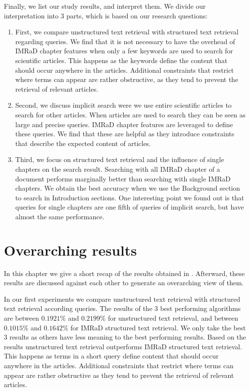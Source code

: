 Finally, we list our study results, and interpret them. We divide our interpretation into $3$ parts, which is based on our research questions:
\begin{enumerate}[label=(\alph*)]
  \item First, we compare unstructured text retrieval with structured text retrieval regarding queries. We find that it is not necessary to have the overhead of IMRaD chapter features when only a few keywords are used to search for scientific articles. This happens as the keywords define the content that should occur anywhere in the articles. Additional constraints that restrict where terms can appear are rather obstructive, as they tend to prevent the retrieval of relevant articles.
  \item Second, we discuss implicit search were we use entire scientific articles to search for other articles. When articles are used to search they can be seen as large and precise queries. IMRaD chapter features are leveraged to define these queries. We find that these are helpful as they introduce constraints that describe the expected content of articles.
  \item Third, we focus on structured text retrieval and the influence of single chapters on the search result. Searching with all IMRaD chapter of a document performs marginally better than searching with single IMRaD chapters. We obtain the best accuracy when we use the Background section to search in Introduction sections. One interesting point we found out is that queries for single chapters are one fifth of queries of implicit search, but have almost the same performance.
\end{enumerate}

\section{Overarching results}
\label{sec:overarching_results}

In this chapter we give a short recap of the results obtained in . Afterward, these results are discussed against each other to generate an overarching view of them.

In our first experiments we compare unstructured text retrieval with structured text retrieval according queries. The results of the $3$ best performing algorithms are between $0.1921\%$ and $0.2199\%$ for unstructured text retrieval, and between $0.1015\%$ and $0.1642\%$ for IMRaD structured text retrieval. We only take the best $3$ results as others have less meaning to the best performing results. Based on the results unstructured text retrieval outperforms IMRaD structured text retrieval. This happens as terms in a short query define content that should occur anywhere in the articles. Additional constraints that restrict where terms can appear are rather obstructive as they tend to prevent the retrieval of relevant articles.

